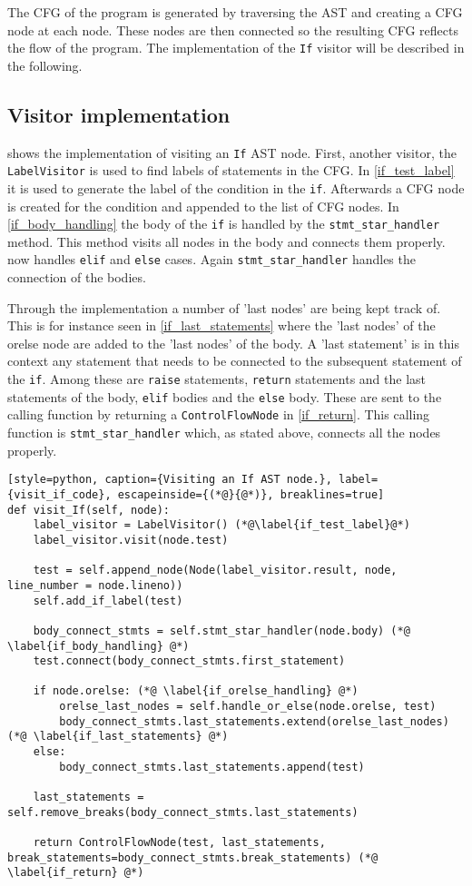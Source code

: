 The CFG of the program is generated by traversing the AST and creating a CFG node at each node.
These nodes are then connected so the resulting CFG reflects the flow of the program.
The implementation of the \texttt{If} visitor will be described in the following.

\subsection{Visitor implementation}\label{cfg:visitor}
 shows the implementation of visiting an \texttt{If} AST node.
First, another visitor, the \texttt{LabelVisitor} is used to find labels of statements in the CFG.
In \cref{if_test_label} it is used to generate the label of the condition in the \texttt{if}.
Afterwards a CFG node is created for the condition and appended to the list of CFG nodes.
In \cref{if_body_handling} the body of the \texttt{if} is handled by the \texttt{stmt\_star\_handler} method.
This method visits all nodes in the body and connects them properly.
 now handles \texttt{elif} and \texttt{else} cases.
Again \texttt{stmt\_star\_handler} handles the connection of the bodies.

Through the implementation a number of 'last nodes' are being kept track of.
This is for instance seen in \cref{if_last_statements} where the 'last nodes' of the orelse node are added to the 'last nodes' of the body.
A 'last statement' is in this context any statement that needs to be connected to the subsequent statement of the \texttt{if}.
Among these are \texttt{raise} statements, \texttt{return} statements and the last statements of the body, \texttt{elif} bodies and the \texttt{else} body.
These are sent to the calling function by returning a \texttt{ControlFlowNode} in \cref{if_return}.
This calling function is \texttt{stmt\_star\_handler} which, as stated above, connects all the nodes properly.

\begin{lstlisting}[style=python, caption={Visiting an If AST node.}, label={visit_if_code}, escapeinside={(*@}{@*)}, breaklines=true]
def visit_If(self, node):
    label_visitor = LabelVisitor() (*@\label{if_test_label}@*)
    label_visitor.visit(node.test)

    test = self.append_node(Node(label_visitor.result, node, line_number = node.lineno))
    self.add_if_label(test)

    body_connect_stmts = self.stmt_star_handler(node.body) (*@ \label{if_body_handling} @*)
    test.connect(body_connect_stmts.first_statement)
        
    if node.orelse: (*@ \label{if_orelse_handling} @*)
        orelse_last_nodes = self.handle_or_else(node.orelse, test)
        body_connect_stmts.last_statements.extend(orelse_last_nodes) (*@ \label{if_last_statements} @*)
    else:
        body_connect_stmts.last_statements.append(test)

    last_statements = self.remove_breaks(body_connect_stmts.last_statements)

    return ControlFlowNode(test, last_statements, break_statements=body_connect_stmts.break_statements) (*@ \label{if_return} @*)
\end{lstlisting}
